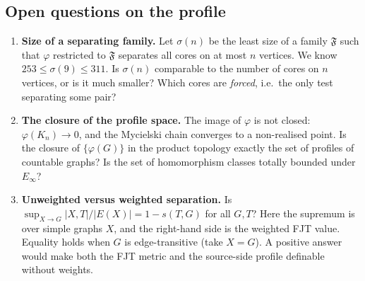 \subsection*{Open questions on the profile}
\begin{enumerate}
\item \textbf{Size of a separating family.}
  Let $\sigma(n)$ be the least size of a family $\mathfrak F$ such that $\varphi$
  restricted to $\mathfrak F$ separates all cores on at most $n$ vertices.
  We know $253\le \sigma(9)\le311$.  Is $\sigma(n)$ comparable to the number of
  cores on $n$ vertices, or is it much smaller?  Which cores are
  \emph{forced}, i.e.\ the only test separating some pair?
\item \textbf{The closure of the profile space.}
  The image of $\varphi$ is not closed: $\varphi(K_n)\to0$, and the
  Mycielski chain converges to a non-realised point.  Is the closure of
  $\{\varphi(G)\}$ in the product topology exactly the set of profiles of
  countable graphs?  Is the set of homomorphism classes totally bounded
  under $E_\infty$?
\item \textbf{Unweighted versus weighted separation.}
  Is
  $\sup_{X\to G}|X,T|/|E(X)|=1-s(T,G)$ for all $G,T$?  Here the supremum is
  over simple graphs $X$, and the right-hand side is the weighted FJT value.
  Equality holds when $G$ is edge-transitive (take $X=G$).  A positive
  answer would make both the FJT metric and the source-side profile
  definable without weights.
\end{enumerate}

%
%
%
%
%
%
